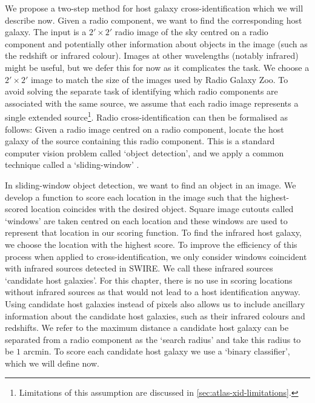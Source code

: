     We propose a two-step method for host galaxy cross-identification
    {which we will describe now}. Given a radio component, we want to find
    the corresponding host galaxy. The input is a $2' \times
    2'$ radio image of
    the sky centred on a radio component {and potentially other information about
    objects in the image (such as the redshift or infrared colour)}. {Images at other wavelengths (notably infrared) might be
    useful, but we defer this for now as it complicates the task.
    {We choose a $2' \times 2'$ image to match} the size of the images used
    by Radio Galaxy Zoo. To avoid solving the separate task of identifying
    which radio components are associated with the same source, we assume
    that each radio image represents a single extended
    source\footnote{Limitations of this assumption are discussed in
    \autoref{sec:atlas-xid-limitations}.}. Radio cross-identification can then
    be formalised as follows: Given a radio image centred on a radio
    component, locate the host galaxy of the source containing this radio
    component. This is a standard computer vision problem called `object
    detection', and we apply a common technique called a `sliding-window'
    \citep{rowley1996facedetection}}.

    {In sliding-window object detection, we want to find an object in an image.
    We develop a function to score each location in the image such that the
    highest-scored location coincides with the desired object. Square image
    cutouts called `windows' are taken centred on each location and these
    windows are used to represent that location in our scoring function. To
    find the infrared host galaxy, we choose the location with the highest
    score. To improve the efficiency of this process when applied to
    cross-identification, we only consider windows coincident with infrared
    sources detected in SWIRE. We call these infrared sources `candidate
    host galaxies'. For this chapter, there is no use in scoring
    locations without infrared sources as that would not lead to a host identification
    anyway. Using candidate host galaxies instead of pixels also
    allows us to include ancillary information about the candidate host
    galaxies, such as their infrared colours and redshifts. We refer to the
    maximum distance a candidate host galaxy can be separated from a radio component as
    the `search radius' and take this radius to be $1$ arcmin. To score each
    candidate host galaxy we use a `binary classifier', which we will define
    now.}

